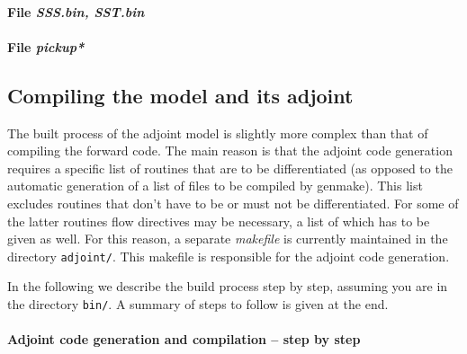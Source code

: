 \paragraph{File {\it SSS.bin, SST.bin}}

\paragraph{File {\it pickup*}}

\subsection{Compiling the model and its adjoint}

The built process of the adjoint model is slightly more
complex than that of compiling the forward code.
The main reason is that the adjoint code generation requires
a specific list of routines that are to be differentiated
(as opposed to the automatic generation of a list of
files to be compiled by genmake).
This list excludes routines that don't have to be or must not be
differentiated. For some of the latter routines flow directives
may be necessary, a list of which has to be given as well.
For this reason, a separate {\it makefile} is currently 
maintained in the directory {\tt adjoint/}. This
makefile is responsible for the adjoint code generation.

In the following we describe the build process step by step,
assuming you are in the directory {\tt bin/}.
A summary of steps to follow is given at the end.

\paragraph{Adjoint code generation and compilation -- step by step}

